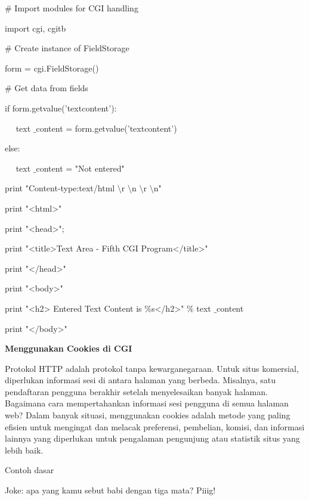 \begin {enumerate}
\begin {enumerate}
\noindent
 $  \#  $ Import modules for CGI handling  \par
\noindent
import cgi, cgitb  \par
\vspace{12pt}
\noindent
 $  \#  $ Create instance of FieldStorage  \par
\noindent
form = cgi.FieldStorage()  \par
\vspace{12pt}
\noindent
 $  \#  $ Get data from fields \par
\noindent
if form.getvalue('textcontent'): \par
\noindent
~~ text $  \_  $content = form.getvalue('textcontent') \par
\noindent
else: \par
\noindent
~~ text $  \_  $content = "Not entered" \par
\vspace{12pt}
\noindent
print "Content-type:text/html $  \setminus  $r $  \setminus  $n $  \setminus  $r $  \setminus  $n" \par
\noindent
print "<html>" \par
\noindent
print "<head>"; \par
\noindent
print "<title>Text Area - Fifth CGI Program</title>" \par
\noindent
print "</head>" \par
\noindent
print "<body>" \par
\noindent
print "<h2> Entered Text Content is  $  \%  $s</h2>"  $  \%  $ text $  \_  $content \par
\noindent
print "</body>" \par
\vspace{12pt}
\noindent
{\fontsize{14pt}{14pt}\selectfont \textbf{Menggunakan Cookies di CGI} \\} \par
\noindent
Protokol HTTP adalah protokol tanpa kewarganegaraan. Untuk situs komersial, diperlukan informasi sesi di antara halaman yang berbeda. Misalnya, satu pendaftaran pengguna berakhir setelah menyelesaikan banyak halaman. Bagaimana cara mempertahankan informasi sesi pengguna di semua halaman web? Dalam banyak situasi, menggunakan cookies adalah metode yang paling efisien untuk mengingat dan melacak preferensi, pembelian, komisi, dan informasi lainnya yang diperlukan untuk pengalaman pengunjung atau statistik situs yang lebih baik. \par
\noindent
Contoh dasar \par
\noindent
Joke: apa yang kamu sebut babi dengan tiga mata? Piiig! \par

\end{enumerate}
\end{enumerate}
